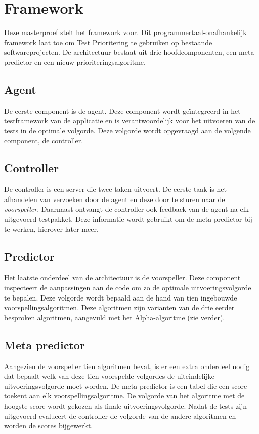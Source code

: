\section{Framework}
\noindent Deze masterproef stelt het \velocity{} framework voor. Dit programmertaal-onafhankelijk framework laat toe om Test Prioritering te gebruiken op bestaande softwareprojecten. De architectuur bestaat uit drie hoofdcomponenten, een meta predictor en een nieuw prioriteringsalgoritme.


\subsection{Agent}
\noindent De eerste component is de agent. Deze component wordt ge\"integreerd in het testframework van de applicatie en is verantwoordelijk voor het uitvoeren van de tests in de optimale volgorde. Deze volgorde wordt opgevraagd aan de volgende component, de controller.

\subsection{Controller}
\noindent De controller is een server die twee taken uitvoert. De eerste taak is het afhandelen van verzoeken door de agent en deze door te sturen naar de \emph{voorspeller}. Daarnaast ontvangt de controller ook feedback van de agent na elk uitgevoerd testpakket. Deze informatie wordt gebruikt om de meta predictor bij te werken, hierover later meer.

\subsection{Predictor}
\noindent Het laatste onderdeel van de architectuur is de voorspeller. Deze component inspecteert de aanpassingen aan de code om zo de optimale uitvoeringsvolgorde te bepalen. Deze volgorde wordt bepaald aan de hand van tien ingebouwde voorspellingsalgoritmen. Deze algoritmen zijn varianten van de drie eerder besproken algoritmen, aangevuld met het Alpha-algoritme (zie verder).

\subsection{Meta predictor}
\noindent Aangezien de voorspeller tien algoritmen bevat, is er een extra onderdeel nodig dat bepaalt welk van deze tien voorspelde volgordes de uiteindelijke uitvoeringsvolgorde moet worden. De meta predictor is een tabel die een score toekent aan elk voorspellingsalgoritme. De volgorde van het algoritme met de hoogste score wordt gekozen als finale uitvoeringsvolgorde. Nadat de tests zijn uitgevoerd evalueert de controller de volgorde van de andere algoritmen en worden de scores bijgewerkt.


